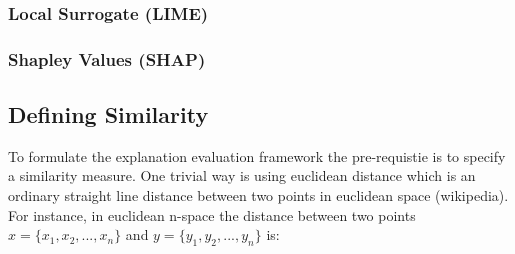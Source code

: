 \documentclass[english]{tktltiki2}
\theoremstyle{definition}
\theoremstyle{remark}
\begin{document}
\subsubsection{Local Surrogate (LIME)} %

\subsubsection{Shapley Values (SHAP)} %

\subsection{Defining Similarity}\label{sec:defining_similarity} %
To formulate the explanation evaluation framework the pre-requistie is to specify a similarity measure. One trivial way is using euclidean distance which is an ordinary straight line distance between two points in euclidean space (wikipedia). For instance, in euclidean n-space the distance between two points $x = \{x_1, x_2, ..., x_n\}$ and $y = \{y_1, y_2, ..., y_n\}$ is:
\end{document}
